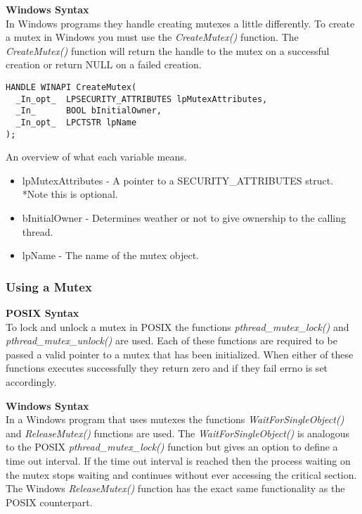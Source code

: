 \documentclass[letterpaper,10pt,notitlepage,fleqn]{article}
\begin{document}
\textbf{Windows Syntax} \\
In Windows programs they handle creating mutexes a little differently. To create a mutex in Windows you must use the \textit{CreateMutex()} function. The \textit{CreateMutex()} function will return the handle to the mutex on a successful creation or return NULL on a failed creation.
\begin{verbatim}
HANDLE WINAPI CreateMutex(
  _In_opt_  LPSECURITY_ATTRIBUTES lpMutexAttributes,
  _In_      BOOL bInitialOwner,
  _In_opt_  LPCTSTR lpName
);
\end{verbatim}

An overview of what each variable means.

\begin{itemize}
\item lpMutexAttributes - A pointer to a SECURITY\_ATTRIBUTES struct. *Note this is optional.
\item bInitialOwner - Determines weather or not to give ownership to the calling thread.
\item lpName - The name of the mutex object.
\end{itemize}

\subsubsection{Using a Mutex}
\textbf{POSIX Syntax} \\
To lock and unlock a mutex in POSIX the functions \textit{pthread\_mutex\_lock()} and \textit{pthread\_mutex\_unlock()} are used. Each of these functions are required to be passed a valid pointer to a mutex that has been initialized. When either of these functions executes successfully they return zero and if they fail errno is set accordingly.

\textbf{Windows Syntax} \\
In a Windows program that uses mutexes the functions \textit{WaitForSingleObject()} and \textit{ReleaseMutex()} functions are used. The  \textit{WaitForSingleObject()} is analogous to the POSIX \textit{pthread\_mutex\_lock()} function but gives an option to define a time out interval. If the time out interval is reached then the process waiting on the mutex stops waiting and continues without ever accessing the critical section. The Windows \textit{ReleaseMutex()} function has the exact same functionality as the POSIX counterpart.
\end{document}
